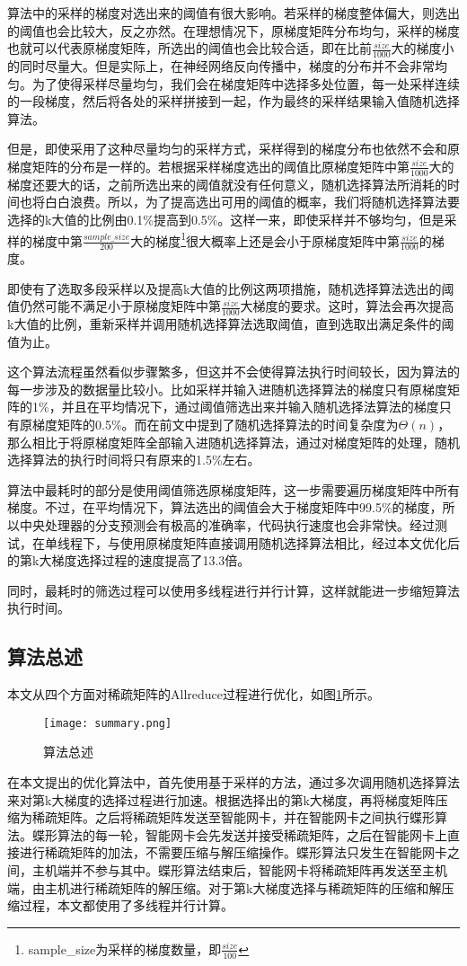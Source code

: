 算法中的采样的梯度对选出来的阈值有很大影响。若采样的梯度整体偏大，则选出的阈值也会比较大，反之亦然。在理想情况下，原梯度矩阵分布均匀，采样的梯度也就可以代表原梯度矩阵，所选出的阈值也会比较合适，即在比前$\frac{size}{1000}$大的梯度小的同时尽量大。但是实际上，在神经网络反向传播中，梯度的分布并不会非常均匀。为了使得采样尽量均匀，我们会在梯度矩阵中选择多处位置，每一处采样连续的一段梯度，然后将各处的采样拼接到一起，作为最终的采样结果输入值随机选择算法。

但是，即使采用了这种尽量均匀的采样方式，采样得到的梯度分布也依然不会和原梯度矩阵的分布是一样的。若根据采样梯度选出的阈值比原梯度矩阵中第$\frac{size}{1000}$大的梯度还要大的话，之前所选出来的阈值就没有任何意义，随机选择算法所消耗的时间也将白白浪费。所以，为了提高选出可用的阈值的概率，我们将随机选择算法要选择的k大值的比例由0.1\%提高到0.5\%。这样一来，即使采样并不够均匀，但是采样的梯度中第$\frac{sample\_size}{200}$大的梯度\footnote{sample\_size为采样的梯度数量，即$\frac{size}{100}$}很大概率上还是会小于原梯度矩阵中第$\frac{size}{1000}$的梯度。

即使有了选取多段采样以及提高k大值的比例这两项措施，随机选择算法选出的阈值仍然可能不满足小于原梯度矩阵中第$\frac{size}{1000}$大梯度的要求。这时，算法会再次提高k大值的比例，重新采样并调用随机选择算法选取阈值，直到选取出满足条件的阈值为止。

这个算法流程虽然看似步骤繁多，但这并不会使得算法执行时间较长，因为算法的每一步涉及的数据量比较小。比如采样并输入进随机选择算法的梯度只有原梯度矩阵的1\%，并且在平均情况下，通过阈值筛选出来并输入随机选择法算法的梯度只有原梯度矩阵的0.5\%。而在前文中提到了随机选择算法的时间复杂度为$\Theta(n)$，那么相比于将原梯度矩阵全部输入进随机选择算法，通过对梯度矩阵的处理，随机选择算法的执行时间将只有原来的1.5\%左右。

算法中最耗时的部分是使用阈值筛选原梯度矩阵，这一步需要遍历梯度矩阵中所有梯度。不过，在平均情况下，算法选出的阈值会大于梯度矩阵中99.5\%的梯度，所以中央处理器的分支预测会有极高的准确率，代码执行速度也会非常快。经过测试，在单线程下，与使用原梯度矩阵直接调用随机选择算法相比，经过本文优化后的第k大梯度选择过程的速度提高了13.3倍。

同时，最耗时的筛选过程可以使用多线程进行并行计算，这样就能进一步缩短算法执行时间。

\subsection{算法总述}
本文从四个方面对稀疏矩阵的Allreduce过程进行优化，如图\ref{fig:summary}所示。

\begin{figure}[ht] %
  \centering
  \texttt{[image: summary.png]}
  \caption{算法总述}
  \label{fig:summary}
\end{figure}

在本文提出的优化算法中，首先使用基于采样的方法，通过多次调用随机选择算法来对第k大梯度的选择过程进行加速。根据选择出的第k大梯度，再将梯度矩阵压缩为稀疏矩阵。之后将稀疏矩阵发送至智能网卡，并在智能网卡之间执行蝶形算法。蝶形算法的每一轮，智能网卡会先发送并接受稀疏矩阵，之后在智能网卡上直接进行稀疏矩阵的加法，不需要压缩与解压缩操作。蝶形算法只发生在智能网卡之间，主机端并不参与其中。蝶形算法结束后，智能网卡将稀疏矩阵再发送至主机端，由主机进行稀疏矩阵的解压缩。对于第k大梯度选择与稀疏矩阵的压缩和解压缩过程，本文都使用了多线程并行计算。